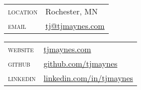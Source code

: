 \vspace{0.1in}
\begin{multicols}{2}
  \setlength{\parskip}{0pt}
  \begin{tabularx}{\linewidth}{@{}l X@{}}
    \textsc{location}    &\small{Rochester, MN}\\
    \textsc{email}       &\href{mailto:tj@tjmaynes.com}{tj@tjmaynes.com}\\
  \end{tabularx}

  \columnbreak

  \begin{tabularx}{\linewidth}{@{}l X@{}}
    \textsc{website}     &\href{https://tjmaynes.com}{tjmaynes.com}\\
    \textsc{github}      &\href{https://github.com/tjmaynes}{github.com/tjmaynes}\\
    \textsc{linkedin}    &\href{https://linkedin.com/in/tjmaynes}{linkedin.com/in/tjmaynes}\\
  \end{tabularx}
\end{multicols}
